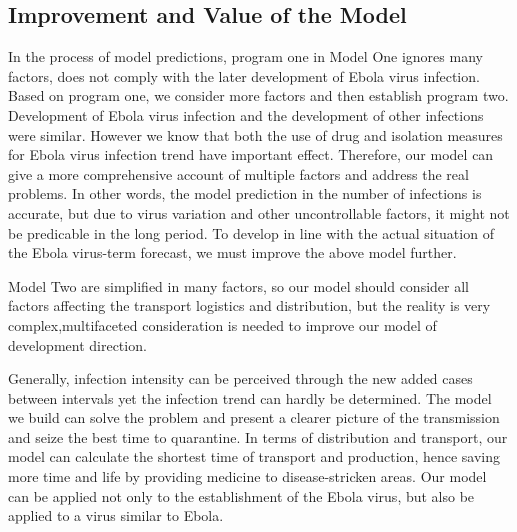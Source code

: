 \documentclass{icmmcm}
\begin{document}
\subsection{Improvement and Value of the Model}
In the process of model predictions, program one in Model One
ignores many factors, does not comply with the later development
of Ebola virus infection. Based on program one, we consider more
factors and then establish program two. Development of Ebola
virus infection and the development of other infections were
similar. However we know that both the use of drug and isolation
measures for Ebola virus infection trend have important
effect. Therefore, our model can give a more comprehensive
account of multiple factors and address the real problems. In
other words, the model prediction in the number of infections is
accurate, but due to virus variation and other uncontrollable
factors, it might not be predicable in the long period. To
develop in line with the actual situation of the Ebola
virus-term forecast, we must improve the above model further.
\par Model Two are simplified in many factors, so our model
should consider all factors affecting the transport logistics
and distribution, but the reality is very complex,multifaceted
consideration is needed to improve our model of development
direction.
\par Generally, infection intensity can be perceived through
the new added cases between intervals yet the infection trend
can hardly be determined. The model we build can solve the
problem and present a clearer picture of the transmission and
seize the best time to quarantine. In terms of distribution and
transport, our model can calculate the shortest time of
transport and production, hence saving more time and life by
providing medicine to disease-stricken areas.
Our model can be applied not only to the
establishment of the Ebola virus, but also be applied to a virus
similar to Ebola.
\end{document}
